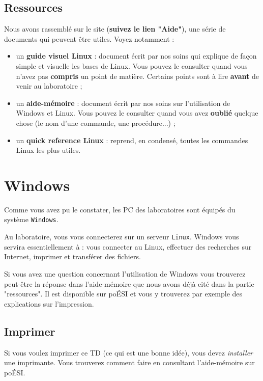 \documentclass[a4paper,11pt]{article}
\begin{document}
\subsection{Ressources}
Nous avons rassemblé sur le site (\textbf{suivez le lien "Aide"}), une série de documents qui peuvent être utiles. Voyez notamment :
\par
\begin{itemize}
\item un \textbf{guide visuel Linux} : document écrit par nos soins qui explique de façon simple et visuelle les bases de Linux. Vous pouvez le consulter quand vous n'avez pas \textbf{compris} un point de matière. Certains points sont à lire \textbf{avant} de venir au laboratoire ;
\item un \textbf{aide-mémoire} : document écrit par nos soins sur l'utilisation de Windows et Linux. Vous pouvez le consulter quand vous avez \textbf{oublié} quelque chose (le nom d'une commande, une procédure...) ;
\item	un \textbf{quick reference Linux} : reprend, en condensé, toutes les commandes Linux les plus utiles. 
\end{itemize}


\section{Windows}

Comme vous avez pu le constater, les PC des laboratoires sont équipés du système \verb_Windows_.
\par			
Au laboratoire, vous vous connecterez sur un serveur \verb_Linux_. Windows vous servira essentiellement à : vous connecter au Linux, 
effectuer des recherches sur Internet, imprimer et transférer des fichiers.
\par
Si vous avez une question concernant l'utilisation de Windows vous trouverez peut-être la réponse dans l'aide-mémoire que nous avons déjà cité dans la partie "ressources". Il est disponible sur poÉSI et vous y trouverez par exemple des explications sur l'impression.
\par			
		

\subsection{Imprimer}
Si vous voulez imprimer ce TD (ce qui est une bonne idée), vous devez \textit{installer} une imprimante. Vous trouverez comment faire en consultant l'aide-mémoire sur poÉSI.
\par
\end{document}
